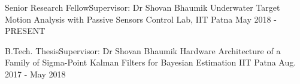 
\begin{cventries}

\cventry
	{Senior Research Fellow\quad\textbar\quad Supervisor: Dr Shovan Bhaumik} %
	{Underwater Target Motion Analysis with Passive Sensors} %
	{Control Lab, IIT Patna} %
	{May 2018 - PRESENT} %
	{\begin{cvitems} %
		\item {}
	\end{cvitems}}

\cventry
	{B.Tech. Thesis\quad\textbar\quad Supervisor: Dr Shovan Bhaumik} %
	{Hardware Architecture of a Family of Sigma-Point Kalman Filters for Bayesian Estimation} %
	{IIT Patna} %
	{Aug. 2017 - May 2018} %
	{\begin{cvitems} %
		\item {}
	\end{cvitems}}

\end{cventries}
